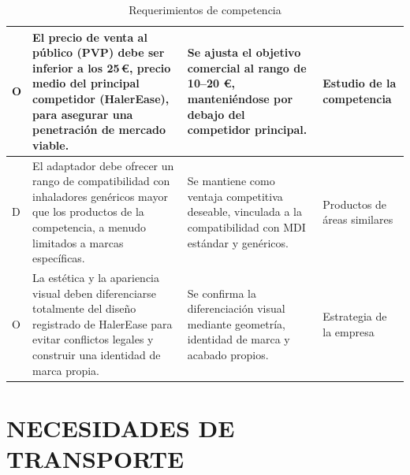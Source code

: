 \documentclass[11pt,a4paper]{article}
\begin{document}
\begin{table}[H]
\begin{tabular}{|p{2.8cm}|p{5.5cm}|p{2.5cm}|p{3.0cm}|}
\hline
O & El precio de venta al público (PVP) debe ser inferior a los 25\,€, precio medio del principal competidor (HalerEase), para asegurar una penetración de mercado viable. & Se ajusta el objetivo comercial al rango de 10--20 €, manteniéndose por debajo del competidor principal. & Estudio de la competencia \\
\hline
D & El adaptador debe ofrecer un rango de compatibilidad con inhaladores genéricos mayor que los productos de la competencia, a menudo limitados a marcas específicas. & Se mantiene como ventaja competitiva deseable, vinculada a la compatibilidad con MDI estándar y genéricos. & Productos de áreas similares \\
\hline
O & La estética y la apariencia visual deben diferenciarse totalmente del diseño registrado de HalerEase para evitar conflictos legales y construir una identidad de marca propia. & Se confirma la diferenciación visual mediante geometría, identidad de marca y acabado propios. & Estrategia de la empresa \\
\hline
\end{tabular}
\caption{Requerimientos de competencia}
\end{table}

\newpage

\section{NECESIDADES DE TRANSPORTE}

\vspace{0.5cm}
\end{document}
